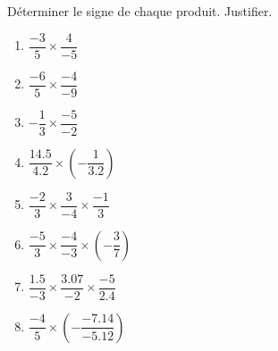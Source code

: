 \begin{exercice*}
    Déterminer le signe de chaque produit. Justifier.
    \begin{multicols}{2}
        \begin{spacing}{2}
            \begin{enumerate}
                \item $\dfrac{-3}{5}\times\dfrac{4}{-5}$
                \item $\dfrac{-6}{5}\times\dfrac{-4}{-9}$
                \item $-\dfrac{1}{3}\times\dfrac{-5}{-2}$
                \item $\dfrac{\num{14.5}}{\num{4.2}}\times\left(-\dfrac{1}{\num{3.2}}\right)$
                \item $\dfrac{-2}{3}\times\dfrac{3}{-4}\times\dfrac{-1}{3}$
                \item $\dfrac{-5}{3}\times\dfrac{-4}{-3}\times\left(-\dfrac{3}{7}\right)$
                \item $\dfrac{\num{1.5}}{-3}\times\dfrac{\num{3.07}}{-2}\times\dfrac{-5}{\num{2.4}}$
                \item $\dfrac{-4}{5}\times\left(-\dfrac{\num{-7.14}}{\num{-5.12}}\right)$
            \end{enumerate}
        \end{spacing}
    \end{multicols}
\end{exercice*}
